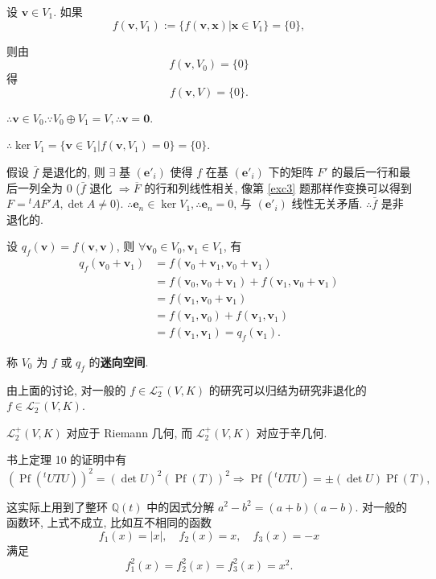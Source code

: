\documentclass{ctexart}
\begin{document}
设 $\boldsymbol{v}\in V_1$. 如果
\[f(\boldsymbol{v},V_1):=\{f(\boldsymbol{v},\boldsymbol{x})|\boldsymbol{x}\in V_1\}=\{0\},\]

则由
\[f(\boldsymbol{v},V_0)=\{0\}\]
得
\[f(\boldsymbol{v},V)=\{0\}.\]

$\therefore\boldsymbol{v}\in V_0.\because V_0\oplus V_1=V,\therefore\boldsymbol{v}=\boldsymbol{0}$.

$\therefore\ker V_1=\{\boldsymbol{v}\in V_1|f(\boldsymbol{v},V_1)=0\}=\{0\}$.

假设 $\bar{f}$ 是退化的, 则 $\exists$ 基 $(\boldsymbol{e}'_i)$ 使得 $f$ 在基 $(\boldsymbol{e}'_i)$ 下的矩阵 $F'$ 的最后一行和最后一列全为 $0$ ($\bar{f}$ 退化 $\Rightarrow\overline{F}$ 的行和列线性相关, 像第 \ref{exc3} 题那样作变换可以得到 $F={}^tAF'A,\det A\neq0$). $\therefore\boldsymbol{e}_n\in\ker V_1,\therefore\boldsymbol{e}_n=0$, 与 $(\boldsymbol{e}'_i)$ 线性无关矛盾. $\therefore\bar{f}$ 是非退化的.

设 $q_f(\boldsymbol{v})=f(\boldsymbol{v},\boldsymbol{v})$, 则 $\forall\boldsymbol{v}_0\in V_0,\boldsymbol{v}_1\in V_1$, 有
\begin{align*}
    q_f(\boldsymbol{v}_0+\boldsymbol{v}_1) & =f(\boldsymbol{v}_0+\boldsymbol{v}_1,\boldsymbol{v}_0+\boldsymbol{v}_1) \\
    & =f(\boldsymbol{v}_0,\boldsymbol{v}_0+\boldsymbol{v}_1)+f(\boldsymbol{v}_1,\boldsymbol{v}_0+\boldsymbol{v}_1) \\
    & =f(\boldsymbol{v}_1,\boldsymbol{v}_0+\boldsymbol{v}_1) \\
    & =f(\boldsymbol{v}_1,\boldsymbol{v}_0)+f(\boldsymbol{v}_1,\boldsymbol{v}_1) \\
    & =f(\boldsymbol{v}_1,\boldsymbol{v}_1)=q_f(\boldsymbol{v}_1).
\end{align*}

称 $V_0$ 为 $f$ 或 $q_f$ 的\textbf{迷向空间}.

由上面的讨论, 对一般的 $f\in\mathcal{L}_2^-(V,K)$ 的研究可以归结为研究非退化的 $f\in\mathcal{L}_2^-(V,K)$.

$\mathcal{L}_2^+(V,K)$ 对应于 Riemann 几何, 而 $\mathcal{L}_2^+(V,K)$ 对应于辛几何.

书上定理 10 的证明中有
\[(\operatorname{Pf}({}^tUTU))^2=(\det U)^2(\operatorname{Pf}(T))^2\Rightarrow\operatorname{Pf}({}^tUTU)=\pm(\det U)\operatorname{Pf}(T),\]

这实际上用到了整环 $\mathbb{Q}(t)$ 中的因式分解 $a^2-b^2=(a+b)(a-b)$. 对一般的函数环, 上式不成立, 比如互不相同的函数
\[f_1(x)=|x|,\quad f_2(x)=x,\quad f_3(x)=-x\]
满足
\[f_1^2(x)=f_2^2(x)=f_3^2(x)=x^2.\]
\end{document}
